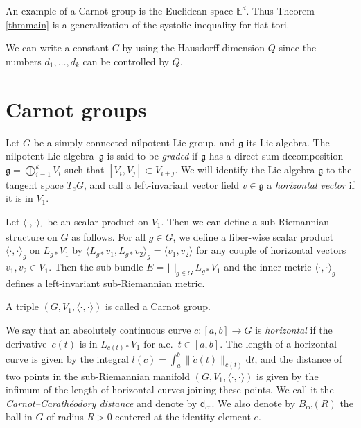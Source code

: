 \documentclass[10pt,a4paper]{amsart}
\numberwithin{equation}{section}
\newcommand{\g}{\mathfrak{g}}
\newcommand{\E}{\mathbb{E}}
\begin{document}
An example of a Carnot group is the Euclidean space $\E^d$.
Thus Theorem \ref{thmmain} is a generalization of the systolic inequality for flat tori.
\begin{Remark}
 We can write a constant $C$ by using the Hausdorff dimension $Q$ since the numbers $d_1,\dots,d_k$ can be controlled by $Q$.
\end{Remark}

\section{Carnot groups}\label{sec2}

Let $G$ be a simply connected nilpotent Lie group,
and $\g$ its Lie algebra.
The nilpotent Lie algebra~$\g$ is said to be \textit{graded} if $\g$ has a direct sum decomposition $\g=\bigoplus_{i=1}^k V_i$ such that $[V_i,V_j]\subset V_{i+j}$.
We will identify the Lie algebra $\g$ to the tangent space $T_eG$,
and call a left-invariant vector field $v\in \g$ a \textit{horizontal vector} if it is in $V_1$.

Let $\langle\cdot,\cdot\rangle_1$ be an scalar product on $V_1$.
Then we can define a sub-Riemannian structure on $G$ as follows.
For all $g\in G$,
we define a fiber-wise scalar product $\langle\cdot,\cdot\rangle_g$ on $L_{g\ast}V_1$ by $\langle L_{g\ast}v_1,L_{g\ast}v_2\rangle_g=\langle v_1,v_2\rangle$ for any couple of horizontal vectors $v_1,v_2\in V_1$.
Then the sub-bundle $E=\bigsqcup_{g\in G}L_{g\ast}V_1$ and the inner metric
$\langle\cdot,\cdot\rangle_g$ defines a left-invariant sub-Riemannian metric.

\begin{Definition}\label{defcarnot}
 A triple $(G,V_1,\langle\cdot,\cdot\rangle)$ is called a Carnot group.
\end{Definition}

We say that an absolutely continuous curve $c\colon[a,b]\to G$ is \textit{horizontal} if the derivative~$\dot{c}(t)$ is in $L_{c(t)\ast}V_1$ for a.e.\ $t\in[a,b]$.
The length of a horizontal curve is given by the integral $l(c)=\int_a^b\|\dot{c}(t)\|_{c(t)}\mathrm{d}t$,
and the distance of two points in the sub-Riemannian manifold $(G,V_1,\langle\cdot,\cdot\rangle)$ is given by the infimum of the length of horizontal curves joining these points.
We call it the \textit{Carnot--Carath\'eodory distance} and denote by $\mathsf{d}_{cc}$.
We also denote by $B_{cc}(R)$ the ball in $G$ of radius $R>0$ centered at the identity element $e$.
\end{document}
